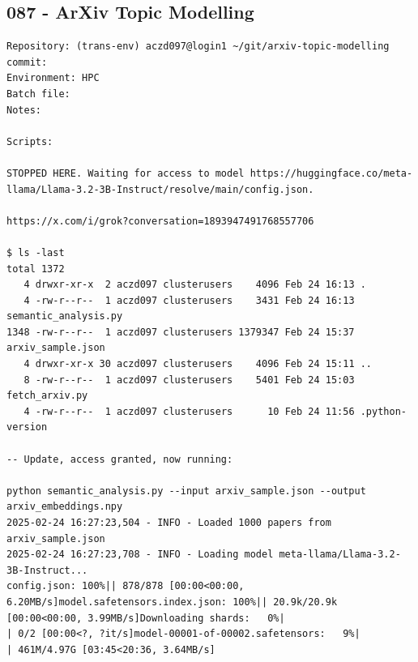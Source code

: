\subsection{087 - ArXiv Topic Modelling}
\label{app_res:085}
\begin{verbatim}
Repository: (trans-env) aczd097@login1 ~/git/arxiv-topic-modelling
commit: 
Environment: HPC 
Batch file: 
Notes: 

Scripts:

STOPPED HERE. Waiting for access to model https://huggingface.co/meta-llama/Llama-3.2-3B-Instruct/resolve/main/config.json.

https://x.com/i/grok?conversation=1893947491768557706

$ ls -last
total 1372
   4 drwxr-xr-x  2 aczd097 clusterusers    4096 Feb 24 16:13 .
   4 -rw-r--r--  1 aczd097 clusterusers    3431 Feb 24 16:13 semantic_analysis.py
1348 -rw-r--r--  1 aczd097 clusterusers 1379347 Feb 24 15:37 arxiv_sample.json
   4 drwxr-xr-x 30 aczd097 clusterusers    4096 Feb 24 15:11 ..
   8 -rw-r--r--  1 aczd097 clusterusers    5401 Feb 24 15:03 fetch_arxiv.py
   4 -rw-r--r--  1 aczd097 clusterusers      10 Feb 24 11:56 .python-version

-- Update, access granted, now running:

python semantic_analysis.py --input arxiv_sample.json --output arxiv_embeddings.npy
2025-02-24 16:27:23,504 - INFO - Loaded 1000 papers from arxiv_sample.json
2025-02-24 16:27:23,708 - INFO - Loading model meta-llama/Llama-3.2-3B-Instruct...
config.json: 100%|| 878/878 [00:00<00:00, 6.20MB/s]model.safetensors.index.json: 100%|| 20.9k/20.9k [00:00<00:00, 3.99MB/s]Downloading shards:   0%|                                                                                                                                                                        | 0/2 [00:00<?, ?it/s]model-00001-of-00002.safetensors:   9%|                                                                                                                               | 461M/4.97G [03:45<20:36, 3.64MB/s]

\end{verbatim}

